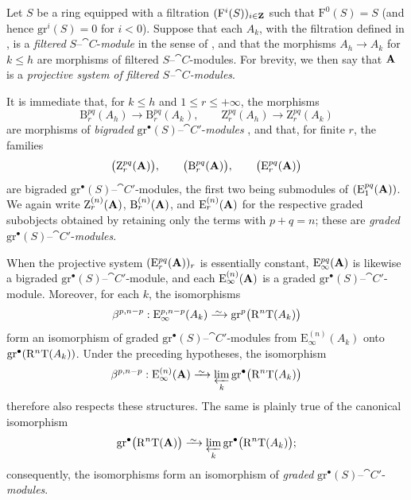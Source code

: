 \begin{env}[13.7.6]
\label{0.13.7.6}
Let $S$ be a ring equipped with a filtration
$(\mathrm{F}^i(S))_{i\in\mathbf{Z}}$ such that
$\mathrm{F}^0(S)=S$ (and hence
$\mathrm{gr}^i(S)=0$ for $i<0$).
Suppose that each $A_k$, with the filtration defined in
, is a \emph{filtered}
$S$--$\cat{C}$-\emph{module} in the sense of , and that the
morphisms $A_h\longrightarrow A_k$ for $k\leq h$ are morphisms of
filtered $S$--$\cat{C}$-modules.
For brevity, we then say that $\mathbf{A}$ is a
\emph{projective system of filtered $S$--$\cat{C}$-modules}.

It is immediate that, for $k\leq h$ and
$1\leq r\leq+\infty$, the morphisms
\[
  \mathrm{B}_r^{pq}(A_h)\longrightarrow\mathrm{B}_r^{pq}(A_k),
  \qquad
  \mathrm{Z}_r^{pq}(A_h)\longrightarrow\mathrm{Z}_r^{pq}(A_k)
\]
are morphisms of \emph{bigraded}
$\mathrm{gr}^\bullet(S)$--$\cat{C}'$-\emph{modules}
, and that, for finite $r$, the families
\[
  \bigl(\mathrm{Z}_r^{pq}(\mathbf{A})\bigr),\qquad
  \bigl(\mathrm{B}_r^{pq}(\mathbf{A})\bigr),\qquad
  \bigl(\mathrm{E}_r^{pq}(\mathbf{A})\bigr)
\]
are bigraded
$\mathrm{gr}^\bullet(S)$--$\cat{C}'$-modules, the first two being
submodules of $(\mathrm{E}_1^{pq}(\mathbf{A}))$.
We again write
$\mathrm{Z}_r^{(n)}(\mathbf{A})$,
$\mathrm{B}_r^{(n)}(\mathbf{A})$, and
$\mathrm{E}_r^{(n)}(\mathbf{A})$ for the respective graded subobjects
obtained by retaining only the terms with $p+q=n$; these are \emph{graded}
$\mathrm{gr}^\bullet(S)$--$\cat{C}'$-\emph{modules}.

When the projective system
$(\mathrm{E}_r^{pq}(\mathbf{A}))_r$ is essentially constant,
$\mathrm{E}_\infty^{pq}(\mathbf{A})$ is likewise a bigraded
$\mathrm{gr}^\bullet(S)$--$\cat{C}'$-module, and each
$\mathrm{E}_\infty^{(n)}(\mathbf{A})$ is a graded
$\mathrm{gr}^\bullet(S)$--$\cat{C}'$-module.
Moreover, for each $k$, the isomorphisms
\[
  \beta^{p,n-p}:
  \mathrm{E}_\infty^{p,n-p}(A_k)
  \isoto
  \mathrm{gr}^p\bigl(\RR^n\mathrm{T}(A_k)\bigr)
\]
form an isomorphism of graded
$\mathrm{gr}^\bullet(S)$--$\cat{C}'$-modules from
$\mathrm{E}_\infty^{(n)}(A_k)$ onto
$\mathrm{gr}^\bullet(\mathrm{R}^n\mathrm{T}(A_k))$.
Under the preceding hypotheses, the isomorphism
\[
  \beta^{p,n-p}:
  \mathrm{E}_\infty^{(n)}(\bb{A})
  \isoto
  \varprojlim_k
  \mathrm{gr}^\bullet\bigl(\RR^n\mathrm{T}(A_k)\bigr)
\]
therefore also respects these structures.
The same is plainly true of the canonical isomorphism
\[
  \mathrm{gr}^\bullet\bigl(\RR^n\mathrm{T}(\bb{A})\bigr)
  \isoto
  \varprojlim_k
  \mathrm{gr}^\bullet\bigl(\RR^n\mathrm{T}(A_k)\bigr);
\]
consequently, the isomorphisms  form an
isomorphism of \emph{graded}
$\mathrm{gr}^\bullet(S)$--$\cat{C}'$-\emph{modules}.
\end{env}


